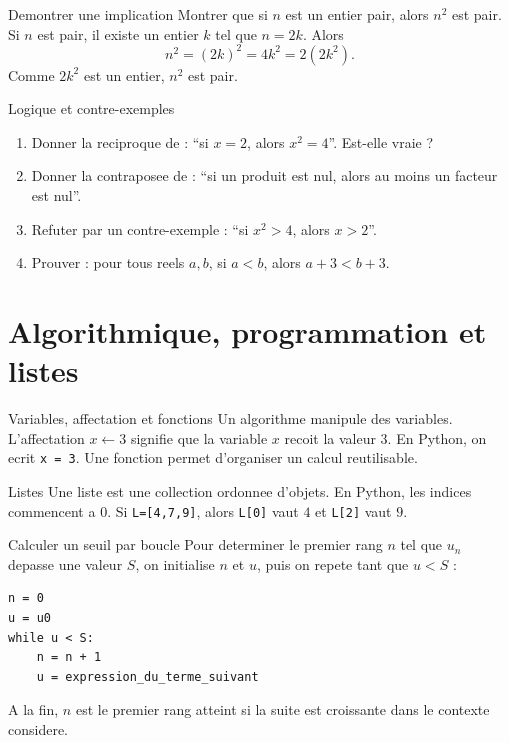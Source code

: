 \documentclass[11pt,a4paper]{article}
\begin{document}
\begin{boiteexemple}{Demontrer une implication}
Montrer que si $n$ est un entier pair, alors $n^2$ est pair.
\smallskip
Si $n$ est pair, il existe un entier $k$ tel que $n=2k$. Alors
\[
n^2=(2k)^2=4k^2=2(2k^2).
\]
Comme $2k^2$ est un entier, $n^2$ est pair.
\end{boiteexemple}

\begin{exobox}{Logique et contre-exemples}
\begin{enumerate}
  \item Donner la reciproque de : ``si $x=2$, alors $x^2=4$''. Est-elle vraie ?
  \item Donner la contraposee de : ``si un produit est nul, alors au moins un facteur est nul''.
  \item Refuter par un contre-exemple : ``si $x^2>4$, alors $x>2$''.
  \item Prouver : pour tous reels $a,b$, si $a<b$, alors $a+3<b+3$.
\end{enumerate}
\end{exobox}


\section{Algorithmique, programmation et listes}

\begin{boitecours}{Variables, affectation et fonctions}
Un algorithme manipule des variables. L'affectation $x\leftarrow 3$ signifie que la variable $x$ recoit la valeur $3$. En Python, on ecrit \texttt{x = 3}. Une fonction permet d'organiser un calcul reutilisable.
\end{boitecours}

\begin{boitecours}{Listes}
Une liste est une collection ordonnee d'objets. En Python, les indices commencent a $0$. Si \texttt{L=[4,7,9]}, alors \texttt{L[0]} vaut $4$ et \texttt{L[2]} vaut $9$.
\end{boitecours}

\begin{boitemethode}{Calculer un seuil par boucle}
Pour determiner le premier rang $n$ tel que $u_n$ depasse une valeur $S$, on initialise $n$ et $u$, puis on repete tant que $u<S$ :
\begin{verbatim}
n = 0
u = u0
while u < S:
    n = n + 1
    u = expression_du_terme_suivant
\end{verbatim}
A la fin, $n$ est le premier rang atteint si la suite est croissante dans le contexte considere.
\end{boitemethode}
\end{document}
